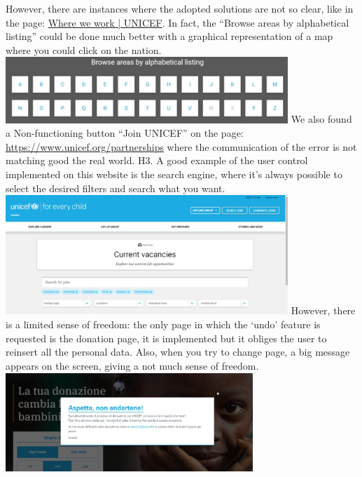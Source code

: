 \newline However, there are instances where the adopted solutions are not so clear, like in the page: \href{https://www.unicef.org/where-we-work}{Where we work | UNICEF}. In fact, the “Browse areas by alphabetical listing” could be done much better with a graphical representation of a map where you could click on the nation.
\newline \includegraphics[width=0.8\textwidth]{FinalScores5.jpg}
\newline We also found a Non-functioning button “Join UNICEF” on the page:  \href{https://www.unicef.org/partnerships}{https://www.unicef.org/partnerships} where the communication of the error is not matching good the real world.
\newline
\newline H3.	A good example of the user control implemented on this website is the search engine, where it’s always possible to select the desired filters and search what you want.
\newline \includegraphics[width=0.8\textwidth]{FinalScores6.jpg}
\newline However, there is a limited sense of freedom: the only page in which the ‘undo’ feature is requested is the donation page, it is implemented but it obliges the user to reinsert all the personal data.
\newline Also, when you try to change page, a big message appears on the screen, giving a not much sense of freedom.
\newline \includegraphics[width=0.7\textwidth]{FinalScores7.jpg}
